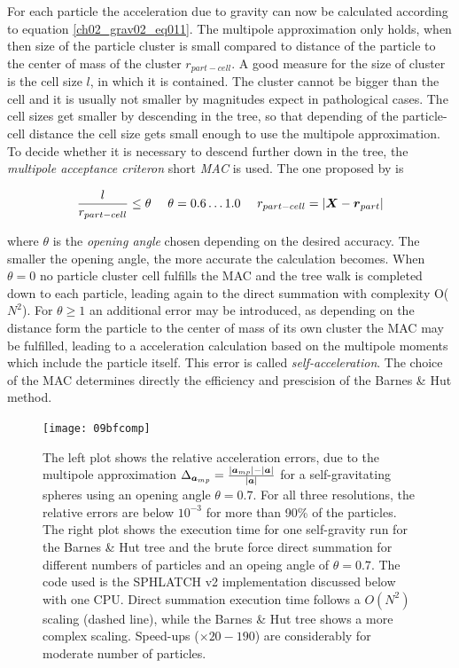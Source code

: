 For each particle the acceleration due to gravity can now be calculated according to equation \ref{ch02_grav02_eq011}. The multipole approximation only holds, when then size of the particle cluster is small compared to distance of the particle to the center of mass of the cluster $r_{part- cell}$. A good measure for the size of cluster is the cell size $l$, in which it is contained. The cluster cannot be bigger than the cell and it is usually not smaller by magnitudes expect in pathological cases. The cell sizes get smaller by descending in the tree, so that depending of the particle-cell distance the cell size gets small enough to use the multipole approximation. To decide whether it is necessary to descend further down in the tree, the \emph{multipole acceptance criteron} short \emph{MAC} is used. The one proposed by \cite{1986Natur.324..446B} is

\begin{equation}
\label{ch02_grav02_eq013}
\frac{l}{r_{part-cell}} \le \theta ~~~~ \theta = 0.6 \dots 1.0 ~~~~ r_{part-cell} = | \boldsymbol{X} - \boldsymbol{r}_{part}|
\end{equation}

where $\theta$ is the \emph{opening angle} chosen depending on the desired accuracy. The smaller the opening angle, the more accurate the calculation becomes. When $\theta = 0$ no particle cluster cell fulfills the MAC and the tree walk is completed down to each particle, leading again to the direct summation with complexity O($N^2$). For $\theta \ge 1$ an additional error may be introduced, as depending on the distance form the particle to the center of mass of its own cluster the MAC may be fulfilled, leading to a acceleration calculation based on the multipole moments which include the particle itself. This error is called \emph{self-acceleration}. The choice of the MAC determines directly the efficiency and prescision of the Barnes \& Hut method.

\begin{figure}[htbp]
\begin{center}
\texttt{[image: 09bfcomp]}
\caption{The left plot shows the relative acceleration errors, due to the multipole approximation $\Delta_{\boldsymbol{a}_{mp}} = \frac{|\boldsymbol{a}_{mp}| - |\boldsymbol{a}|}{|\boldsymbol{a}|}$ for a self-gravitating spheres using an opening angle $\theta = 0.7$. For all three resolutions, the relative errors are below $10^{-3}$ for more than 90\% of the particles. 
The right plot shows the execution time for one self-gravity run for the Barnes \& Hut tree and the brute force direct summation for different numbers of particles and an opeing angle of $\theta = 0.7$. The code used is the SPHLATCH v2 implementation discussed below with one CPU. Direct summation execution time follows a $O(N^2)$ scaling (dashed line), while the Barnes \& Hut tree shows a more complex scaling. Speed-ups ($\times 20-190$) are considerably for moderate number of particles.}
\label{ch02_grav02_fig03}
\end{center}
\end{figure}


